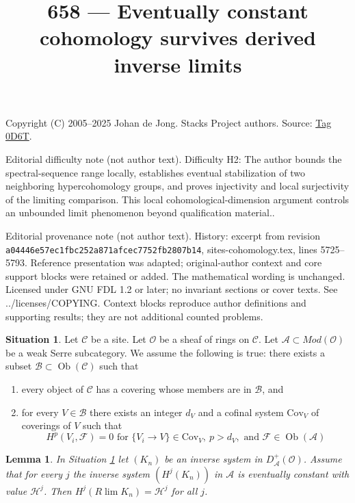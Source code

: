 \documentclass{amsart}
\theoremstyle{plain}
\newtheorem{lemma}[subsection]{Lemma}
\theoremstyle{definition}
\newtheorem{situation}[subsection]{Situation}
\theoremstyle{remark}
\numberwithin{equation}{subsection}
\def\lim{\mathop{\mathrm{lim}}\nolimits}
\def\Ob{\mathop{\mathrm{Ob}}\nolimits}
\begin{document}
\title[Stacks Project, Tag 0D6T]{658 --- Eventually constant cohomology survives derived inverse limits}
\maketitle
\noindent Copyright (C) 2005--2025 Johan de Jong. Stacks Project authors. Source: \href{https://stacks.math.columbia.edu/tag/0D6T}{Tag 0D6T}.

\noindent Editorial difficulty note (not author text). Difficulty H2: The author bounds the spectral-sequence range locally, establishes eventual stabilization of two neighboring hypercohomology groups, and proves injectivity and local surjectivity of the limiting comparison. This local cohomological-dimension argument controls an unbounded limit phenomenon beyond qualification material..

\noindent Editorial provenance note (not author text). History: excerpt from revision \texttt{a0444\allowbreak 6e57e\allowbreak c1fbc\allowbreak 252a8\allowbreak 71afc\allowbreak ec775\allowbreak 2fb28\allowbreak 07b14}, sites-cohomology.tex, lines 5725--5793. Reference presentation was adapted; original-author context and core support blocks were retained or added. The mathematical wording is unchanged. Licensed under GNU FDL 1.2 or later; no invariant sections or cover texts. See ../licenses/COPYING. Context blocks reproduce author definitions and supporting results; they are not additional counted problems.

\begin{situation}
\label{situation-olsson-laszlo}
Let $\mathcal{C}$ be a site. Let $\mathcal{O}$ be a sheaf of rings on
$\mathcal{C}$. Let $\mathcal{A} \subset \textit{Mod}(\mathcal{O})$
be a weak Serre subcategory. We assume the following is true:
there exists a subset $\mathcal{B} \subset \Ob(\mathcal{C})$ such that
\begin{enumerate}
\item every object of $\mathcal{C}$ has a covering whose
members are in $\mathcal{B}$, and
\item for every $V \in \mathcal{B}$ there exists an integer $d_V$
and a cofinal system $\text{Cov}_V$ of coverings of $V$ such
that
$$
H^p(V_i, \mathcal{F}) = 0 \text{ for }
\{V_i \to V\} \in \text{Cov}_V,\ p > d_V, \text{ and }
\mathcal{F} \in \Ob(\mathcal{A})
$$
\end{enumerate}
\end{situation}

\begin{lemma}
\label{lemma-olsson-laszlo-modified}
In Situation \ref{situation-olsson-laszlo} let
$(K_n)$ be an inverse system in $D_\mathcal{A}^+(\mathcal{O})$.
Assume that for every $j$ the inverse system $(H^j(K_n))$
in $\mathcal{A}$ is eventually constant with value $\mathcal{H}^j$. Then
$H^j(R\lim K_n) = \mathcal{H}^j$ for all $j$.
\end{lemma}
\end{document}
